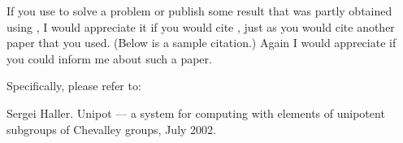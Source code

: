 
If you  use {\Unipot} to solve a problem or publish some  result
that was partly obtained  using {\Unipot}, I would appreciate it
if you would  cite {\Unipot},  just  as you  would  cite another
paper that you used. (Below is a sample citation.) Again I would
appreciate if you could inform me about such a paper.

Specifically, please refer to:
 
\begintt
[Hal02] Sergei Haller. Unipot --- a system for computing with elements
        of unipotent subgroups of Chevalley groups, July 2002.
\endtt
